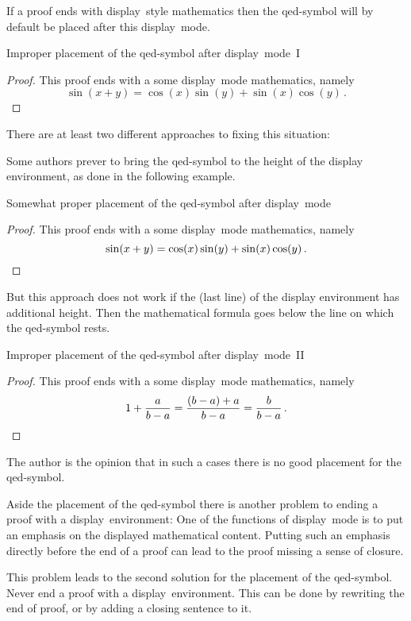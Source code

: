 If a proof ends with display~style mathematics then the qed-symbol will by default be placed after this display~mode.
\begin{showlatex}{Improper placement of the qed-symbol after display~mode~I}
\begin{proof}
  This proof ends with a some display~mode mathematics, namely
  \[
    \sin(x+y)
    =
    \cos(x)\sin(y) + \sin(x)\cos(y) \,.
  \]
\end{proof}
\end{showlatex}
There are at least two different approaches to fixing this situation:

Some authors prever to bring the qed-symbol to the height of the display environment, as done in the following example.
\begin{showlatex}{Somewhat proper placement of the qed-symbol after display~mode}
\begin{proof}
  This proof ends with a some display~mode mathematics, namely
  \[
    \sin(x+y)
    =
    \cos(x)\sin(y) + \sin(x)\cos(y) \,.
    \qedhere
  \]
\end{proof}
\end{showlatex}
But this approach does not work if the (last line) of the display environment has additional height.
Then the mathematical formula goes below the line on which the qed-symbol rests.
\begin{showlatex}{Improper placement of the qed-symbol after display~mode~II}
\begin{proof}
  This proof ends with a some display~mode mathematics, namely
  \[
    1
    + \frac{a}{b - a}
    =
    \frac{(b - a) + a}{b - a}
    =
    \frac{b}{b - a} \,.
    \qedhere
  \]
\end{proof}
\end{showlatex}
The author is the opinion that in such a cases there is no good placement for the qed-symbol.

Aside the placement of the qed-symbol there is another problem to ending a proof with a display~environment:
One of the functions of display~mode is to put an emphasis on the displayed mathematical content.
Putting such an emphasis directly before the end of a proof can lead to the proof missing a sense of closure.

This problem leads to the second solution for the placement of the qed-symbol.
Never end a proof with a display~environment.
This can be done by rewriting the end of proof, or by adding a closing sentence to it.


